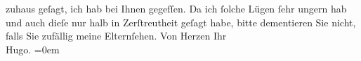 \begin{ledgroupsized}[t]{13cm}
               zuhaus geſagt, ich hab bei Ihnen gegeſſen. Da ich ſolche Lügen ſehr ungern hab {\pb}und auch dieſe nur halb in
               Zerſtreutheit geſagt habe, bitte dementieren Sie nicht, falls Sie zufällig meine Elternſehen.\pend
           \pstart
           Von Herzen Ihr{\\[\baselineskip]}\spacefill\mbox{Hugo.}\pend
           \leftskip=0em{}
         
         \endnumbering{}\end{ledgroupsized}  \newcommand{\dateiname}{L00873}\newcommand{\titel}{Hugo von Hofmannsthal an Arthur Schnitzler, [1. 1. 1899]}\newcommand{\editorInnen}{Martin Anton Müller und Gerd-Hermann Susen}
      